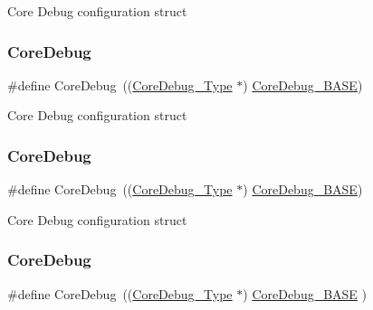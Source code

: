 Core Debug configuration struct \mbox{\label{group___c_m_s_i_s__core__base_gab6e30a2b802d9021619dbb0be7f5d63d}} 
\subsubsection{\texorpdfstring{CoreDebug}{CoreDebug}\hspace{0.1cm}{\footnotesize\ttfamily [5/8]}}
{\footnotesize\ttfamily \#define Core\+Debug~((\mbox{\hyperlink{struct_core_debug___type}{Core\+Debug\+\_\+\+Type}} $\ast$)     \mbox{\hyperlink{group___c_m_s_i_s__core__base_ga680604dbcda9e9b31a1639fcffe5230b}{Core\+Debug\+\_\+\+B\+A\+SE}})}

Core Debug configuration struct \mbox{\label{group___c_m_s_i_s__core__base_gab6e30a2b802d9021619dbb0be7f5d63d}} 
\subsubsection{\texorpdfstring{CoreDebug}{CoreDebug}\hspace{0.1cm}{\footnotesize\ttfamily [6/8]}}
{\footnotesize\ttfamily \#define Core\+Debug~((\mbox{\hyperlink{struct_core_debug___type}{Core\+Debug\+\_\+\+Type}} $\ast$)     \mbox{\hyperlink{group___c_m_s_i_s__core__base_ga680604dbcda9e9b31a1639fcffe5230b}{Core\+Debug\+\_\+\+B\+A\+SE}})}

Core Debug configuration struct \mbox{\label{group___c_m_s_i_s__core__base_gab6e30a2b802d9021619dbb0be7f5d63d}} 
\subsubsection{\texorpdfstring{CoreDebug}{CoreDebug}\hspace{0.1cm}{\footnotesize\ttfamily [7/8]}}
{\footnotesize\ttfamily \#define Core\+Debug~((\mbox{\hyperlink{struct_core_debug___type}{Core\+Debug\+\_\+\+Type}} $\ast$)     \mbox{\hyperlink{group___c_m_s_i_s__core__base_ga680604dbcda9e9b31a1639fcffe5230b}{Core\+Debug\+\_\+\+B\+A\+SE}}   )}

